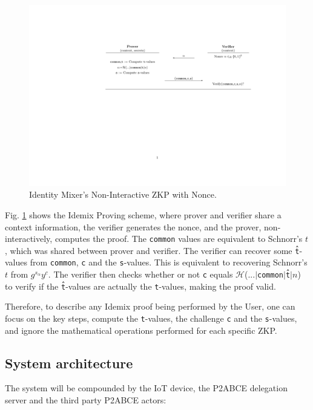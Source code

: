 \begin{figure}[bth]
	\includegraphics[width=\linewidth]{gfx/niZKPnonce}
	\caption{Identity Mixer's Non-Interactive ZKP with Nonce.}
	\label{fig:niZKPnonce}
\end{figure}

Fig. \ref{fig:niZKPnonce} shows the Idemix Proving scheme, where prover and verifier share a context information, the verifier generates the nonce, and the prover, non-interactively, computes the proof. The \texttt{common} values are equivalent to Schnorr's $t$, which was shared between prover and verifier. The verifier can recover some \texttt{\^t}-values from \texttt{common}, \texttt{c} and the \texttt{s}-values. This is equivalent to recovering Schnorr's $t$ from $g^{s_\alpha} y^c$. The verifier then checks whether or not \texttt{c} equals $\mathcal{H}$(...$\mid$\texttt{common}$\mid$\texttt{\^t}$\mid$$n$) to verify if the \texttt{\^t}-values are actually the \texttt{t}-values, making the proof valid.


Therefore, to describe any Idemix proof being performed by the User, one can focus on the key steps, compute the \texttt{t}-values, the challenge \texttt{c} and the \texttt{s}-values, and ignore the mathematical operations performed for each specific ZKP.



\subsection{System architecture}

The system will be compounded by the IoT device, the P2ABCE delegation server and the third party P2ABCE actors:

